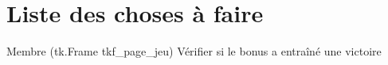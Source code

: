 \chapter{Liste des choses à faire}
\hypertarget{todo}{}\label{todo}

\begin{DoxyRefList}
\item[Membre \doxylink{namespacesrc_1_1controller_1_1ctrl__pageJeu_a6522f20b78261f4f0a9a60b7d9598e7b}{src.controller.ctrl\+\_\+page\+Jeu.cpj\+\_\+use\+\_\+bonus} (tk.\+Frame tkf\+\_\+page\+\_\+jeu)]\label{todo__todo000001}%
%
Vérifier si le bonus a entraîné une victoire 
\end{DoxyRefList}